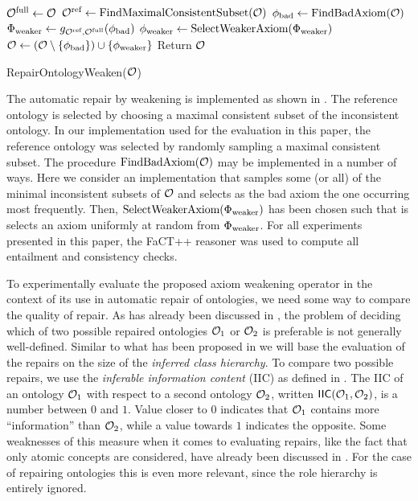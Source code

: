 \documentclass[
]{ceurart}
\begin{document}
\begin{algorithm}[t]
  \begin{algorithmic}
    \State ${\mathcal{O}^\textnormal{full}} \gets \mathcal{O}$
    \State ${\mathcal{O}^\textnormal{ref}} \gets \textnormal{FindMaximalConsistentSubset(\ensuremath{\mathcal{O}})}$
      \State $\phi_\textnormal{bad} \gets \textnormal{FindBadAxiom}(\mathcal{O})$
      \State $\Phi_\textnormal{weaker} \gets g_{{\mathcal{O}^\textnormal{ref}},{\mathcal{O}^\textnormal{full}}}(\phi_\textnormal{bad})$
      \State $\phi_\textnormal{weaker} \gets \textnormal{SelectWeakerAxiom}(\Phi_\textnormal{weaker})$
      \State $\mathcal{O} \gets (\mathcal{O} \setminus \{\phi_\textnormal{bad}\}) \cup \{\phi_\textnormal{weaker}\}$
    \EndWhile
    \State Return $\mathcal{O}$
  \end{algorithmic}
  \caption{RepairOntologyWeaken($\mathcal{O}$)}
	\label{algo:repair-weaken}
\end{algorithm}

The automatic repair by weakening is implemented as shown in . The reference ontology is selected by choosing a maximal consistent subset of the inconsistent ontology. In our implementation used for the evaluation in this paper, the reference ontology was selected by randomly sampling a maximal consistent subset. The procedure $\textnormal{FindBadAxiom}(\mathcal{O})$ may be implemented in a number of ways. Here we consider an implementation that samples some (or all) of the minimal inconsistent subsets of $\mathcal{O}$ and selects as the bad axiom the one occurring most frequently. Then, $\textnormal{SelectWeakerAxiom}(\Phi_\textnormal{weaker})$ has been chosen such that is selects an axiom uniformly at random from $\Phi_\textnormal{weaker}$. For all experiments presented in this paper, the FaCT++ reasoner \cite{tsarkov2006fact++} was used to compute all entailment and consistency checks.

To experimentally evaluate the proposed axiom weakening operator in the context of its use in automatic repair of ontologies, we need some way to compare the quality of repair. As has already been discussed in \cite{troquard2018repairing}, the problem of deciding which of two possible repaired ontologies $\mathcal{O}_1$ or $\mathcal{O}_2$ is preferable is not generally well-defined. Similar to what has been proposed in \cite{troquard2018repairing} we will base the evaluation of the repairs on the size of the \emph{inferred class hierarchy}. To compare two possible repairs, we use the \emph{inferable information content} (IIC) as defined in \cite{troquard2018repairing}. The IIC  of an ontology $\mathcal{O}_1$ with respect to a second ontology $\mathcal{O}_2$, written ${\mathsf{IIC}}(\mathcal{O}_1, \mathcal{O}_2)$, is a number between $0$ and $1$. Value closer to $0$ indicates that $\mathcal{O}_1$ contains more ``information'' than $\mathcal{O}_2$, while a value towards $1$ indicates the opposite. Some weaknesses of this measure when it comes to evaluating repairs, like the fact that only atomic concepts are considered, have already been discussed in \cite{troquard2018repairing}. For the case of repairing \SROIQ ontologies this is even more relevant, since the role hierarchy is entirely ignored.
\end{document}
